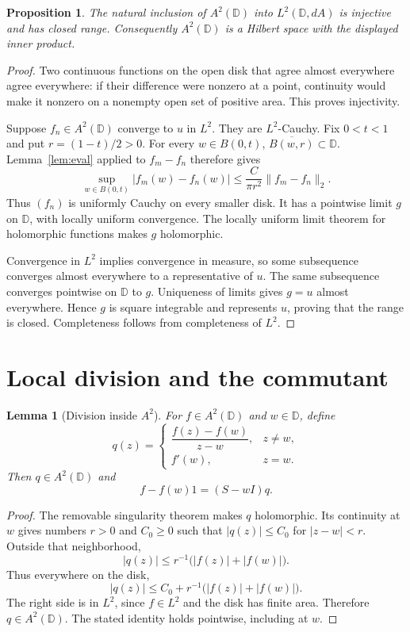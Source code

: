 \documentclass[11pt]{article}
\newtheorem{lemma}[theorem]{Lemma}
\newtheorem{proposition}[theorem]{Proposition}
\newcommand{\D}{\mathbb D}
\newcommand{\A}{A^2(\D)}
\newcommand{\norm}[1]{\lVert #1\rVert}
\begin{document}
\begin{proposition}\label{prop:hilbert}
The natural inclusion of $\A$ into $L^2(\D,dA)$ is injective and has closed
range. Consequently $\A$ is a Hilbert space with the displayed inner product.
\end{proposition}
\begin{proof}
Two continuous functions on the open disk that agree almost everywhere agree
everywhere: if their difference were nonzero at a point, continuity would
make it nonzero on a nonempty open set of positive area. This proves
injectivity.

Suppose $f_n\in\A$ converge to $u$ in $L^2$. They are $L^2$-Cauchy. Fix
$0<t<1$ and put $r=(1-t)/2>0$. For every $w\in B(0,t)$,
$\overline{B(w,r)}\subset\D$. Lemma~\ref{lem:eval} applied to $f_m-f_n$
therefore gives
\[
 \sup_{w\in B(0,t)}|f_m(w)-f_n(w)|
 \leq\frac{C}{\pi r^2}\norm{f_m-f_n}_2.
\]
Thus $(f_n)$ is uniformly Cauchy on every smaller disk. It has a pointwise
limit $g$ on $\D$, with locally uniform convergence. The locally uniform
limit theorem for holomorphic functions makes $g$ holomorphic.

Convergence in $L^2$ implies convergence in measure, so some subsequence
converges almost everywhere to a representative of $u$. The same subsequence
converges pointwise on $\D$ to $g$. Uniqueness of limits gives $g=u$ almost
everywhere. Hence $g$ is square integrable and represents $u$, proving that
the range is closed. Completeness follows from completeness of $L^2$.
\end{proof}

\section{Local division and the commutant}
\begin{lemma}[Division inside $A^2$]\label{lem:division}
For $f\in\A$ and $w\in\D$, define
\[
 q(z)=\begin{cases}
 \dfrac{f(z)-f(w)}{z-w},&z\ne w,\\[4pt]
 f'(w),&z=w.
 \end{cases}
\]
Then $q\in\A$ and
\[
 f-f(w)1=(S-wI)q.
\]
\end{lemma}
\begin{proof}
The removable singularity theorem makes $q$ holomorphic. Its continuity at
$w$ gives numbers $r>0$ and $C_0\geq0$ such that $|q(z)|\leq C_0$ for
$|z-w|<r$. Outside that neighborhood,
\[
 |q(z)|\leq r^{-1}\bigl(|f(z)|+|f(w)|\bigr).
\]
Thus everywhere on the disk,
\[
 |q(z)|\leq C_0+r^{-1}\bigl(|f(z)|+|f(w)|\bigr).
\]
The right side is in $L^2$, since $f\in L^2$ and the disk has finite area.
Therefore $q\in\A$. The stated identity holds pointwise, including at $w$.
\end{proof}
\end{document}
